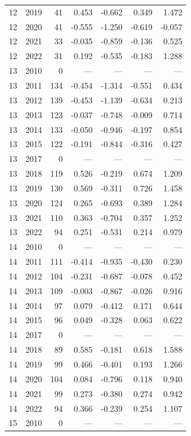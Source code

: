 \begin{longtable}{llrrrrr}
12 & 2019 & 41 & 0.453 & -0.662 & 0.349 & 1.472 \\
12 & 2020 & 41 & -0.555 & -1.250 & -0.619 & -0.057 \\
12 & 2021 & 33 & -0.035 & -0.859 & -0.136 & 0.525 \\
12 & 2022 & 31 & 0.192 & -0.535 & -0.183 & 1.288 \\
13 & 2010 & 0 & --- & --- & --- & --- \\
13 & 2011 & 134 & -0.454 & -1.314 & -0.551 & 0.434 \\
13 & 2012 & 139 & -0.453 & -1.139 & -0.634 & 0.213 \\
13 & 2013 & 123 & -0.037 & -0.748 & -0.009 & 0.714 \\
13 & 2014 & 133 & -0.050 & -0.946 & -0.197 & 0.854 \\
13 & 2015 & 122 & -0.191 & -0.844 & -0.316 & 0.427 \\
13 & 2017 & 0 & --- & --- & --- & --- \\
13 & 2018 & 119 & 0.526 & -0.219 & 0.674 & 1.209 \\
13 & 2019 & 130 & 0.569 & -0.311 & 0.726 & 1.458 \\
13 & 2020 & 124 & 0.265 & -0.693 & 0.389 & 1.284 \\
13 & 2021 & 110 & 0.363 & -0.704 & 0.357 & 1.252 \\
13 & 2022 & 94 & 0.251 & -0.531 & 0.214 & 0.979 \\
14 & 2010 & 0 & --- & --- & --- & --- \\
14 & 2011 & 111 & -0.414 & -0.935 & -0.430 & 0.230 \\
14 & 2012 & 104 & -0.231 & -0.687 & -0.078 & 0.452 \\
14 & 2013 & 109 & -0.003 & -0.867 & -0.026 & 0.916 \\
14 & 2014 & 97 & 0.079 & -0.412 & 0.171 & 0.644 \\
14 & 2015 & 96 & 0.049 & -0.328 & 0.063 & 0.622 \\
14 & 2017 & 0 & --- & --- & --- & --- \\
14 & 2018 & 89 & 0.585 & -0.181 & 0.618 & 1.588 \\
14 & 2019 & 99 & 0.466 & -0.401 & 0.193 & 1.266 \\
14 & 2020 & 104 & 0.084 & -0.796 & 0.118 & 0.940 \\
14 & 2021 & 99 & 0.273 & -0.380 & 0.274 & 0.942 \\
14 & 2022 & 94 & 0.366 & -0.239 & 0.254 & 1.107 \\
15 & 2010 & 0 & --- & --- & --- & --- \\

\end{longtable}
